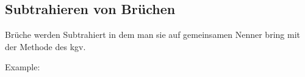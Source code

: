 \subsection{Subtrahieren von Brüchen}

Brüche werden Subtrahiert in dem man sie auf gemeinsamen Nenner bring mit der Methode des kgv.

\hfill \break
Example:
\fboxrule=0.8pt 